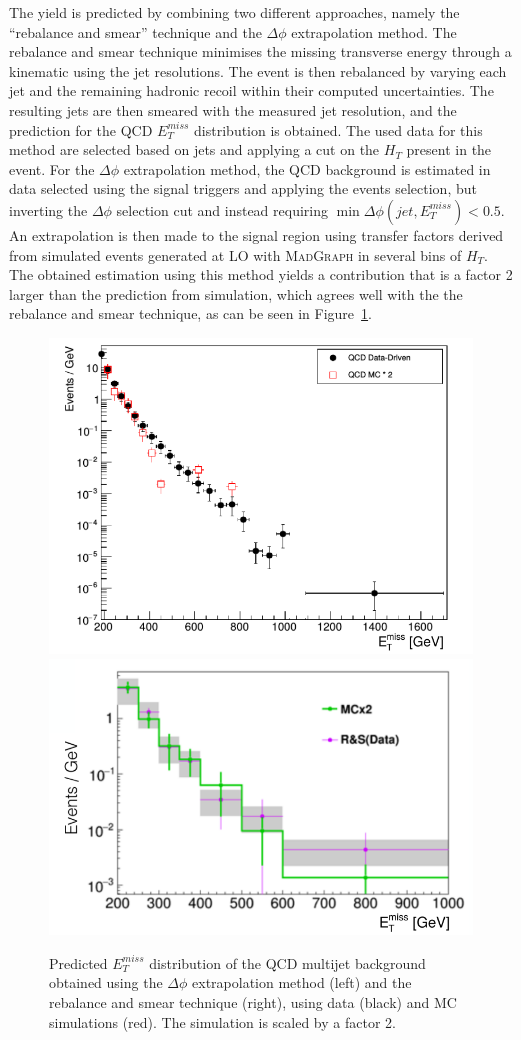 The yield is predicted by combining two different approaches, namely the ``rebalance and smear'' technique and the $\Delta\phi$ extrapolation method. The rebalance and smear technique minimises the missing transverse energy through a kinematic using the jet resolutions. The event is then rebalanced by varying each jet and the remaining hadronic recoil within their computed uncertainties. The resulting jets are then smeared with the measured jet resolution, and the prediction for the QCD $E_T^{miss}$ distribution is obtained. The used data for this method are selected based on jets and applying a cut on the $H_T$ present in the event. For the $\Delta\phi$ extrapolation method, the QCD background is estimated in data selected using the signal triggers and applying the events selection, but inverting the $\Delta\phi$ selection cut and instead requiring $\min\Delta\phi(jet, E_T^{miss}) < 0.5$. An extrapolation is then made to the signal region using transfer factors derived from simulated events generated at \ac{LO} with \textsc{MadGraph} in several bins of $H_T$. The obtained estimation using this method yields a contribution that is a factor 2 larger than the prediction from simulation, which agrees well with the the rebalance and smear technique, as can be seen in Figure~\ref{fig:QCD_prediction}.

\begin{figure}[ht]
  \centering
 \includegraphics[width=.46\textwidth]{QCD_prediction.png} 
 \includegraphics[width=.52\textwidth]{rebalanceandsmear.png} 
 \caption{Predicted $E_T^{miss}$ distribution of the QCD multijet background obtained using the $\Delta\phi$ extrapolation method (left) and the rebalance and smear technique (right), using data (black) and MC simulations (red). The simulation is scaled by a factor 2.}
 \label{fig:QCD_prediction}
\end{figure}

